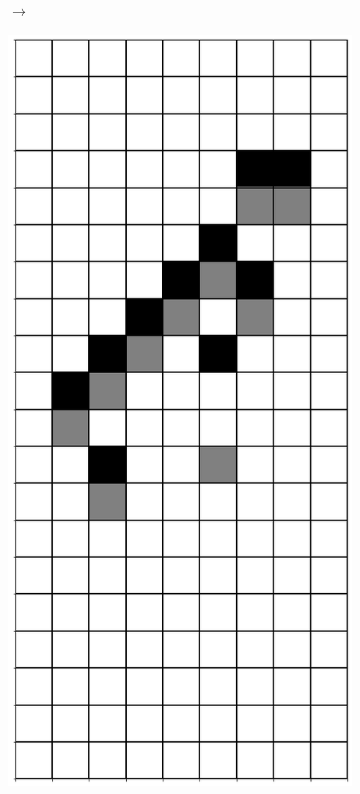 \documentclass[12pt]{article}
\numberwithin{figure}{section} %
\begin{document}
\begin{figure}[H]
\begin{subfigure}{0.3\textwidth}
     		\subcaption{}
   	\end{subfigure}
	\begin{subfigure}[t]{0.03\textwidth}
    		{\LARGE$\xrightarrow{}$}
  	\end{subfigure}	
      	\newline
	\begin{subfigure}[t]{0.03\textwidth}
		\phantom{A}
  	\end{subfigure}	
      	\begin{subfigure}{0.3\textwidth}
     		\centering
     		\includegraphics[angle=270,width=\linewidth]{Section4/22.6}

\end{subfigure}
\end{figure}
\end{document}
